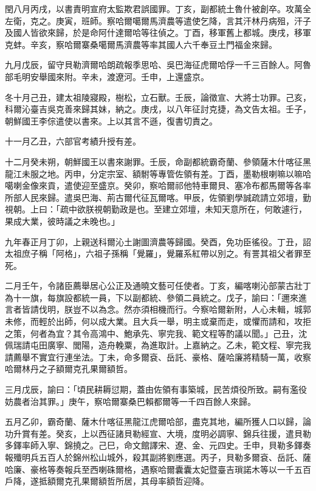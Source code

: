 \begin{pinyinscope}
閏八月丙戌，以書責明宣府太監欺君誤國罪。丁亥，副都統土魯什被創卒。攻萬全左衛，克之。庚寅，班師。察哈爾噶爾馬濟農等遣使乞降，言其汗林丹病殂，汗子及國人皆欲來歸，於是命阿什達爾哈等往偵之。丁酉，移軍舊上都城。庚戌，移軍克蚌。辛亥，察哈爾寨桑噶爾馬濟農等率其國人六千奉豆土門福金來歸。

九月戊辰，留守貝勒濟爾哈朗疏報季思哈、吳巴海征虎爾哈俘一千三百餘人。阿魯部毛明安舉國來附。辛未，渡遼河。壬申，上還盛京。

冬十月己丑，建太祖陵寢殿，樹松，立石獸。壬辰，論徵宣、大將士功罪。己亥，科爾沁臺吉吳克善來歸其妹，納之。庚戌，以八年征討克捷，為文告太祖。壬子，朝鮮國王李倧遣使以書來。上以其言不遜，復書切責之。

十一月乙丑，六部官考績升授有差。

十二月癸未朔，朝鮮國王以書來謝罪。壬辰，命副都統霸奇蘭、參領薩木什喀征黑龍江未服之地。丙申，分定宗室、額駙等專管佐領有差。丁酉，墨勒根喇嘛以嘛哈噶喇金像來貢，遣使迎至盛京。癸卯，察哈爾祁他特車爾貝、塞冷布都馬爾等各率所部人民來歸。遣吳巴海、荊古爾代征瓦爾喀。甲辰，佐領劉學誠疏請立郊壇，勤視朝。上曰：「疏中欲朕視朝勤政是也。至建立郊壇，未知天意所在，何敢遽行，果成大業，彼時議之未晚也。」

九年春正月丁卯，上親送科爾沁土謝圖濟農等歸國。癸酉，免功臣徭役。丁丑，詔太祖庶子稱「阿格」，六祖子孫稱「覺羅」，覺羅系紅帶以別之。有詈其祖父者罪至死。

二月壬午，令諸臣薦舉居心公正及通曉文藝可任使者。丁亥，編喀喇沁部蒙古壯丁為十一旗，每旗設都統一員，下以副都統、參領二員統之。戊子，諭曰：「邇來進言者皆請伐明，朕豈不以為念。然亦須相機而行。今察哈爾新附，人心未輯，城郭未修，而輕於出師，何以成大業。且大兵一舉，明主或棄而走，或懼而請和，攻拒之策，何者為宜？其令高鴻中、鮑承先、寧完我、範文程等酌議以聞。」己丑，沈佩瑞請屯田廣寧、閭陽，造舟輓粟，為進取計。上嘉納之。乙未，範文程、寧完我請薦舉不實宜行連坐法。丁未，命多爾袞、岳託、豪格、薩哈廉將精騎一萬，收察哈爾林丹之子額爾克孔果爾額哲。

三月戊辰，諭曰：「頃民耕耨愆期，蓋由佐領有事築城，民苦煩役所致。嗣有濫役妨農者治其罪。」庚午，察哈爾寨桑巴賴都爾等一千四百餘人來歸。

五月乙卯，霸奇蘭、薩木什喀征黑龍江虎爾哈部，盡克其地，編所獲人口以歸，論功升賞有差。癸亥，上以西征諸貝勒經宣、大境，度明必調寧、錦兵往援，遣貝勒多鐸率師入寧、錦撓之。己巳，命文館譯宋、遼、金、元四史。壬申，貝勒多鐸奏報殲明兵五百人於錦州松山城外，殺其副將劉應選。丙子，貝勒多爾袞、岳託、薩哈廉、豪格等奏報兵至西喇硃爾格，遇察哈爾囊囊太妃暨臺吉瑣諾木等以一千五百戶降，遂抵額爾克孔果爾額哲所居，其母率額哲迎降。


\end{pinyinscope}
